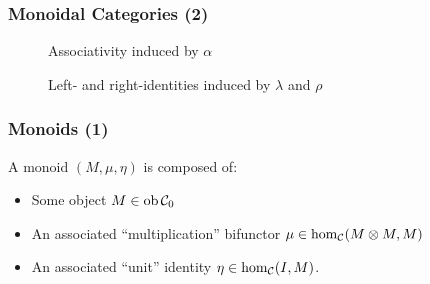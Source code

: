 \documentclass{beamer}
\numberwithin{figure}{section}
\begin{document}
\begin{frame}
        \frametitle{Monoidal Categories (2)}
        \begin{figure}
                \caption{Associativity induced by $\alpha$}
        \end{figure}

        \vfill
        \pause
        \begin{figure}
                \caption{Left- and right-identities induced by $\lambda$ and
                $\rho$}
        \end{figure}
\end{frame}

\begin{frame}
        \frametitle{Monoids (1)}
        A monoid $(M,\mu,\eta)$ is composed of:
        \begin{itemize}
                \item Some object $M \in \operatorname{ob} \mathcal{C}_0$
                \item An associated ``multiplication'' bifunctor $\mu \in
                        \hom_\mathcal{C} (M \otimes M, M)$
                \item An associated ``unit'' identity
                        $\eta \in \hom_\mathcal{C} (I, M)$.
        \end{itemize}
\end{frame}
\end{document}
